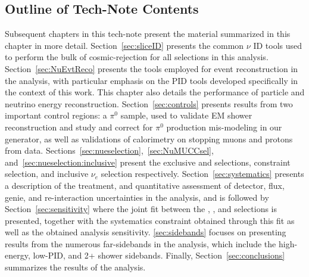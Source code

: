 

\subsection{Outline of Tech-Note Contents}
\par Subsequent chapters in this tech-note present the material summarized in this chapter in more detail. Section~\ref{sec:sliceID} presents the common $\nu$ ID tools used to perform the bulk of cosmic-rejection for all selections in this analysis. Section~\ref{sec:NuEvtReco} presents the tools employed for event reconstruction in the analysis, with particular emphasis on the PID tools developed specifically in the context of this work. This chapter also details the performance of particle and neutrino energy reconstruction. Section~\ref{sec:controls} presents results from two important control regions: a $\pi^0$ sample, used to validate EM shower reconstruction and study and correct for $\pi^0$ production mis-modeling in our generator, as well as validations of \dedx calorimetry on stopping muons and protons from data. Sections~\ref{sec:nueselection},~\ref{sec:NuMUCCsel}, and~\ref{sec:nueselection:inclusive} present the exclusive \nue \npsel and \zpsel selections, constraint \numu selection, and inclusive $\nu_e$ selection respectively. Section~\ref{sec:systematics} presents a description of the treatment, and quantitative assessment of detector, flux, genie, and re-interaction uncertainties in the analysis, and is followed by Section~\ref{sec:sensitivity} where the joint fit between the \npsel, \zpsel, and \numu selections is presented, together with the systematics constraint obtained through this fit as well as the obtained analysis sensitivity. \cref{sec:sidebands} focuses on presenting results from the numerous far-sidebands in the analysis, which include the high-energy, low-PID, and 2+ shower sidebands.
Finally, Section~\ref{sec:conclusions} summarizes the results of the analysis.


\newpage
